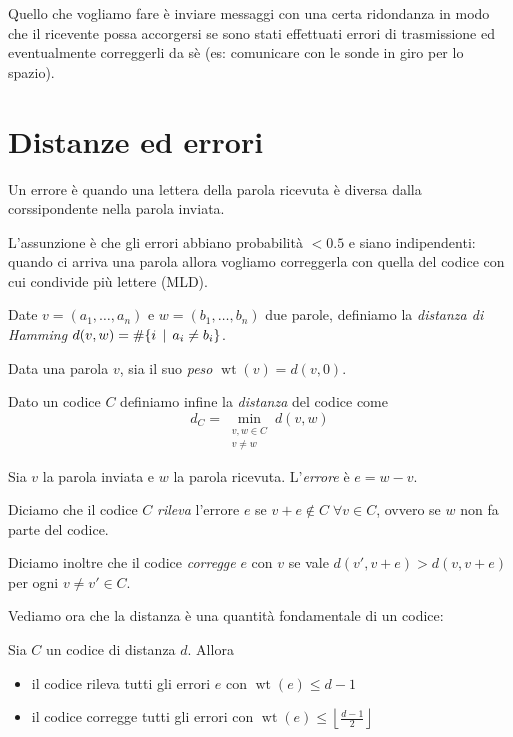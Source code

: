 \documentclass[a4paper]{book}
\DeclareMathOperator{\wt}{wt}
\begin{document}
    Quello che vogliamo fare è inviare messaggi con una certa ridondanza in modo che il ricevente possa accorgersi se sono stati effettuati errori di trasmissione ed eventualmente correggerli da sè (es: comunicare con le sonde in giro per lo spazio).

    \section{Distanze ed errori}
    Un errore è quando una lettera della parola ricevuta è diversa dalla corssipondente nella parola inviata.

    L'assunzione è che gli errori abbiano probabilità $<0.5$ e siano indipendenti: quando ci arriva una parola allora vogliamo correggerla con quella del codice con cui condivide più lettere (MLD).

    \begin{definition}
        Date $v=(a_1,\dots,a_n)$ e $w=(b_1,\dots, b_n)$ due parole, definiamo la \emph{distanza di Hamming} $d(v,w)=\#\{ i\operatorname{\; |\;} a_i\neq b_i \}$.

        Data una parola $v$, sia il suo \emph{peso} $\wt(v)=d(v,0)$.

        Dato un codice $C$ definiamo infine la \emph{distanza} del codice come $$d_C=\min_{\substack{v,w\in C\\v\neq w}}d(v,w)$$
    \end{definition}

    \begin{definition}
        Sia $v$ la parola inviata e $w$ la parola ricevuta. L'\emph{errore} è $e=w-v$.

        Diciamo che il codice $C$ \emph{rileva} l'errore $e$ se $v+e\not\in C\;\forall v\in C$, ovvero se $w$ non fa parte del codice.

        Diciamo inoltre che il codice \emph{corregge} $e$ con $v$ se vale $d(v',v+e)>d(v,v+e)$ per ogni $v\neq v'\in C$.
    \end{definition}

    Vediamo ora che la distanza è una quantità fondamentale di un codice:

    \begin{proposition}
        Sia $C$ un codice di distanza $d$. Allora
        \begin{itemize}
            \item il codice rileva tutti gli errori $e$ con $\wt(e)\le d-1$
            \item il codice corregge tutti gli errori con $\wt(e)\le\left\lfloor\frac{d-1}{2}\right\rfloor$
        \end{itemize}
    \end{proposition}
\end{document}
